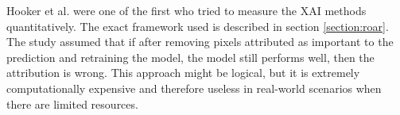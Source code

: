 \vspace{\baselineskip}

Hooker et al. \cite{hooker2018benchmark} were one of the first who tried to measure the XAI methods quantitatively. The exact framework used is described in section \ref{section:roar}. The study assumed that if after removing pixels attributed as important to the prediction and retraining the model, the model still performs well, then the attribution is wrong. This approach might be logical, but it is extremely computationally expensive and therefore useless in real-world scenarios when there are limited resources.